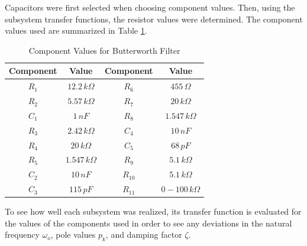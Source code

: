 Capacitors were first selected when choosing component values. Then, using the subsystem transfer functions, the resistor values were determined. The component values used are summarized in Table \ref{tbl:comp}.

\begin{table}[H]
\centering
\begin{tabular}{|c|c|c|c|}
\hline
Component & Value & Component & Value\\ \hline\hline
$R_1$ & $12.2\,k\Omega$ & $R_6$ & $455\,\Omega$ \\ \hline
$R_2$ & $5.57\,k\Omega$ & $R_7$ & $20\,k\Omega$ \\ \hline
$C_1$ & $1\,nF$ & $R_8$ & $1.547\,k\Omega$ \\ \hline
$R_3$ & $2.42\,k\Omega$ & $C_4$ & $10\,nF$ \\ \hline
$R_4$ & $20\,k\Omega$ & $C_5$ & $68\,pF$ \\ \hline
$R_5$ & $1.547\,k\Omega$ & $R_9$ & $5.1\,k\Omega$ \\ \hline
$C_2$ & $10\,nF$ & $R_{10}$ & $5.1\,k\Omega$ \\ \hline
$C_3$ & $115\,pF$ & $R_{11}$ & $0-100\,k\Omega$ \\ \hline
\end{tabular}
\caption{Component Values for Butterworth Filter\label{tbl:comp}}
\end{table}


To see how well each subsystem was realized, its transfer function is evaluated for the values of the components used in order to see any deviations in the natural frequency $\omega_o$, pole values $p_k$, and damping factor $\zeta$. 

